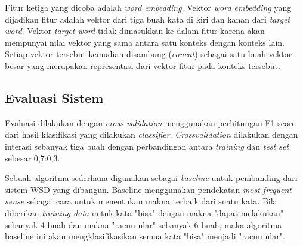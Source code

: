 Fitur ketiga yang dicoba adalah \textit{word embedding}. Vektor \textit{word embedding} yang dijadikan fitur adalah vektor dari tiga buah kata di kiri dan kanan dari \textit{target word}. Vektor \textit{target word} tidak dimasukkan ke dalam fitur karena akan mempunyai nilai vektor yang sama antara satu konteks dengan konteks lain. Setiap vektor tersebut kemudian disambung (\textit{concat}) sebagai satu buah vektor besar yang merupakan representasi dari vektor fitur pada konteks tersebut. 

\subsection{Evaluasi Sistem}
Evaluasi dilakukan dengan \textit{cross validation} menggunakan perhitungan F1-score dari hasil klasifikasi yang dilakukan \textit{classifier}. \textit{Crossvalidation} dilakukan dengan interasi sebanyak tiga buah dengan perbandingan antara \textit{training} dan \textit{test set} sebesar 0,7:0,3.

Sebuah algoritma sederhana digunakan sebagai \textit{baseline} untuk pembanding dari sistem WSD yang dibangun. Baseline menggunakan pendekatan \textit{most frequent sense} sebagai cara untuk menentukan makna terbaik dari suatu kata. Bila diberikan \textit{training data} untuk kata "bisa" dengan makna "dapat melakukan" sebanyak 4 buah dan makna "racun ular" sebanyak 6 buah, maka algoritma baseline ini akan mengklasifikasikan semua kata "bisa" menjadi "racun ular".

